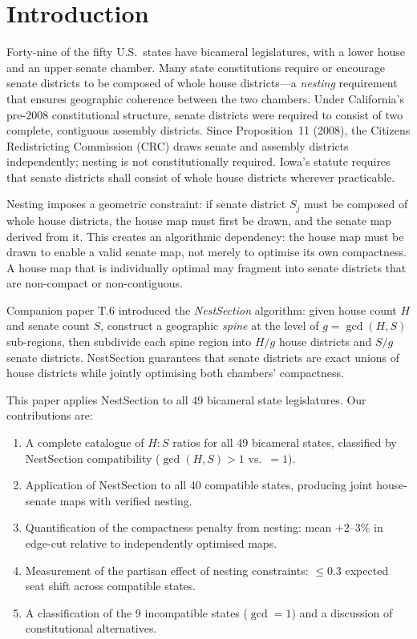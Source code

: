 \section{Introduction}
\label{sec:intro}

Forty-nine of the fifty U.S.\ states have bicameral legislatures, with a lower
house and an upper senate chamber. Many state constitutions require or encourage
senate districts to be composed of whole house districts---a \emph{nesting}
requirement that ensures geographic coherence between the two chambers.
Under California's pre-2008 constitutional structure, senate districts were required
to consist of two complete, contiguous assembly districts.
Since Proposition~11 (2008), the Citizens Redistricting Commission (CRC) draws
senate and assembly districts independently; nesting is not constitutionally required.
Iowa's statute requires that senate districts shall consist of whole house
districts wherever practicable.

Nesting imposes a geometric constraint: if senate district $S_j$ must be
composed of whole house districts, the house map must first be drawn, and the
senate map derived from it. This creates an algorithmic dependency: the house
map must be drawn to enable a valid senate map, not merely to optimise its
own compactness. A house map that is individually optimal may fragment into
senate districts that are non-compact or non-contiguous.

Companion paper T.6 \citep{dellaLibera2026nestSection} introduced the
\emph{NestSection} algorithm: given house count $H$ and senate count $S$,
construct a geographic \emph{spine} at the level of $g = \gcd(H, S)$
sub-regions, then subdivide each spine region into $H/g$ house districts
and $S/g$ senate districts. NestSection guarantees that senate districts are
exact unions of house districts while jointly optimising both chambers' compactness.

This paper applies NestSection to all 49 bicameral state legislatures.
Our contributions are:
\begin{enumerate}
  \item A complete catalogue of $H:S$ ratios for all 49 bicameral states,
    classified by NestSection compatibility ($\gcd(H,S) > 1$ vs.\ $= 1$).
  \item Application of NestSection to all 40 compatible states, producing
    joint house-senate maps with verified nesting.
  \item Quantification of the compactness penalty from nesting: mean $+2$--$3\%$
    in edge-cut relative to independently optimised maps.
  \item Measurement of the partisan effect of nesting constraints: $\leq 0.3$
    expected seat shift across compatible states.
  \item A classification of the 9 incompatible states ($\gcd = 1$) and
    a discussion of constitutional alternatives.
\end{enumerate}

